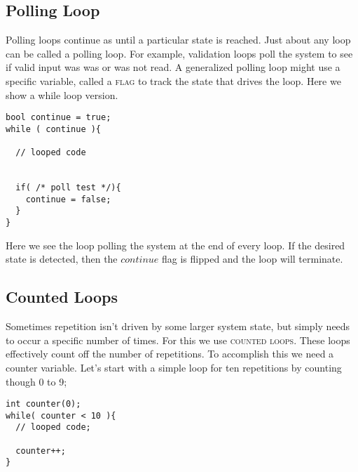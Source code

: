 \documentclass[]{tufte-handout}
\begin{document}
\subsection{Polling Loop}

Polling loops continue as until a particular state is reached.  Just about any loop can be called a polling loop.  For example, validation loops poll the system to see if valid input was was or was not read. A generalized polling loop might use a specific variable, called a \textsc{flag} to track the state that drives the loop. Here we show a while loop version.

\begin{verbatim}
bool continue = true;
while ( continue ){

  // looped code

	
  if( /* poll test */){
    continue = false;
  }
}
\end{verbatim}
Here we see the loop polling the system at the end of every loop. If the desired state is detected, then the $continue$ flag is flipped and the loop will terminate.

\subsection{Counted Loops}

Sometimes repetition isn't driven by some larger system state, but simply needs to occur a specific number of times.  For this we use \textsc{counted loops}.  These loops effectively count off the number of repetitions.  To accomplish this we need a counter variable. Let's start with a simple loop for ten repetitions by counting though 0 to 9;

\begin{verbatim}
int counter(0);
while( counter < 10 ){
  // looped code;

  counter++;	
}
\end{verbatim}
\end{document}
